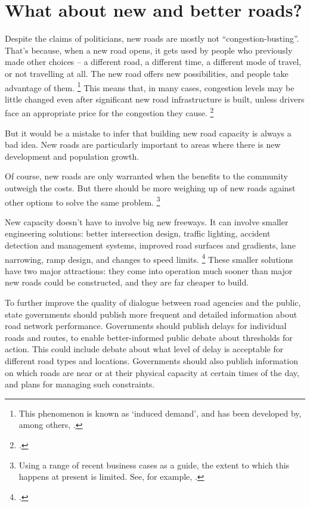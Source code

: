 \documentclass{grattan}
\begin{document}
\section{What about new and better roads?}\label{sec:Consider-alternatives-to-building-new-roads}

Despite the claims of politicians, new roads are mostly not ``congestion-busting''.
That's because, when a new road opens, it gets used by people who previously made other choices  -- a different road, a different time, a different mode of travel, or not travelling at all.
The new road offers new possibilities, and people take advantage of them.%
\footnote{This phenomenon is known as ‘induced demand', and has been developed by, among others, \textcites{1991-Small-Urban-transport-economics}{1962-Downs-peak-hour-congestion}.}
This means that, in many cases, congestion levels may be  little changed even after significant new road infrastructure is built, unless drivers face an appropriate price for the congestion they cause.%
    \footcite{Duranton-Turner-2009-Fundamental-Law-of-Road-Congestion}

But it would be a mistake to infer that building new road capacity is always a bad idea. New roads are particularly important to areas where there is new development and population growth.

Of course, new roads are only warranted when the benefits to the community outweigh the costs. But there should be more weighing up of new roads against other options to solve the same problem.%
\footnote{Using a range of recent business cases as a guide, the extent to which this happens at present is limited.
See, for example, \textcite{SGS2016WestConnexreview}.}

New capacity doesn't have to involve big new freeways. It can involve smaller engineering solutions: better intersection design, traffic lighting, accident detection and management systems, improved road surfaces and gradients, lane narrowing, ramp design, and changes to speed limits.
\footcites[][14]{Arnott-Alternatives-to-road-pricing}[][28]{2016-Bertaud}[][29]{2009-queue-duckers}
These smaller solutions have two major attractions: they come into operation much sooner than major new roads could be constructed, and they are far cheaper to build.

To further improve the quality of dialogue between road agencies and the public, state governments should publish more frequent and detailed information about road network performance.
Governments should publish delays for individual roads and routes, to enable better-informed public debate about thresholds for action.
This could include debate about what level of delay is acceptable for different road types and locations.
Governments should also publish information on which roads are near or at their physical capacity at certain times of the day, and plans for managing such constraints.
\end{document}
